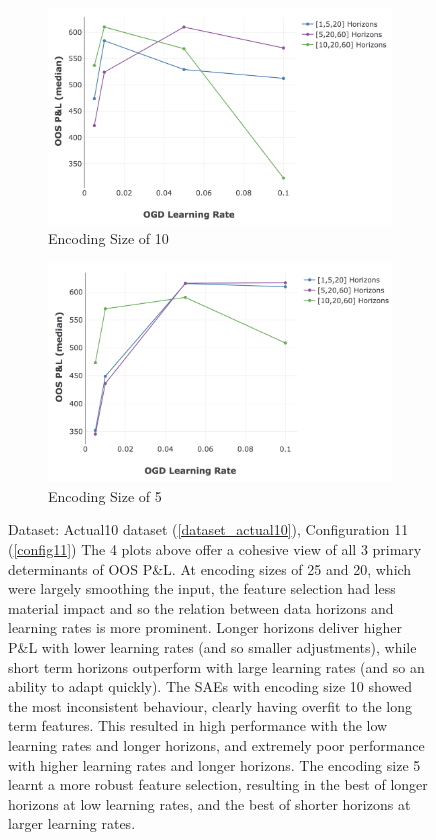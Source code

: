 \documentclass[a4paper,11pt,oneside]{article}
\theoremstyle{plain}
\theoremstyle{definition}
\begin{document}
\begin{figure}[H]
			\begin{subfigure}{0.48\linewidth}
				\centering\includegraphics[scale=0.33]{images/results/8_2_determinants/OOS_OGDLR_Delta_Encoding_10_median.png}
				\caption{Encoding Size of 10}
			\end{subfigure}%
			\begin{subfigure}{0.49\linewidth}
				\centering\includegraphics[scale=0.33]{images/results/8_2_determinants/OOS_OGDLR_Delta_Encoding_5_median.png}
				\caption{Encoding Size of 5}
			\end{subfigure}
		\caption[OOS P\&L By Feature Selection Size, OGD Learning Rate and Data Horizons]
		{Dataset: Actual10 dataset (\ref{dataset_actual10}), Configuration 11 (\ref{config11})		
			\newline The 4 plots above offer a cohesive view of all 3 primary determinants of OOS P\&L. At encoding sizes of 25 and 20, which were largely smoothing the input, the feature selection had less material impact and so the relation between data horizons and learning rates is more prominent. Longer horizons deliver higher P\&L with lower learning rates (and so smaller adjustments), while short term horizons outperform with large learning rates (and so an ability to adapt quickly). The SAEs with encoding size 10 showed the most inconsistent behaviour, clearly having overfit to the long term features. This resulted in high performance with the low learning rates and longer horizons, and extremely poor performance with higher learning rates and longer horizons. The encoding size 5 learnt a more robust feature selection, resulting in the best of longer horizons at low learning rates, and the best of shorter horizons at larger learning rates. }

\end{figure}
\end{document}
